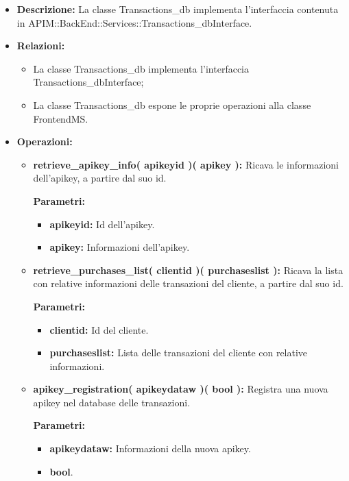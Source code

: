 \begin{itemize}
	\item \textbf{Descrizione:} La classe Transactions\_db implementa l'interfaccia contenuta in APIM::BackEnd::Services::Transactions\_dbInterface.
	\item \textbf{Relazioni:}
		\begin{itemize}
			\item La classe Transactions\_db implementa l'interfaccia Transactions\_dbInterface;
			\item La classe Transactions\_db espone le proprie operazioni alla classe FrontendMS.
		\end{itemize}
	\item \textbf{Operazioni:}
		\begin{itemize}
		
			\item \textbf{retrieve\_apikey\_info( apikeyid )( apikey ):} Ricava le informazioni dell'apikey, a partire dal suo id.
				\begin{description}
    				\item[\textbf{Parametri:}]
				\end{description}
				\begin{itemize}
					\item \textbf{apikeyid:} Id dell'apikey.
					\item \textbf{apikey:} Informazioni dell'apikey.
				\end{itemize}
				
			\item \textbf{retrieve\_purchases\_list( clientid )( purchaseslist ):} Ricava la lista con relative informazioni delle transazioni del cliente, a partire dal suo id.
				\begin{description}
    				\item[\textbf{Parametri:}]
				\end{description}
				\begin{itemize}
					\item \textbf{clientid:} Id del cliente.
					\item \textbf{purchaseslist:} Lista delle transazioni del cliente con relative informazioni.
				\end{itemize}
				
			\item \textbf{apikey\_registration( apikeydataw )( bool ):} Registra una nuova apikey nel database delle transazioni.
				\begin{description}
    				\item[\textbf{Parametri:}]
				\end{description}
				\begin{itemize}
					\item \textbf{apikeydataw:} Informazioni della nuova apikey.
					\item \textbf{bool}.
				\end{itemize}
				

\end{itemize}
\end{itemize}

